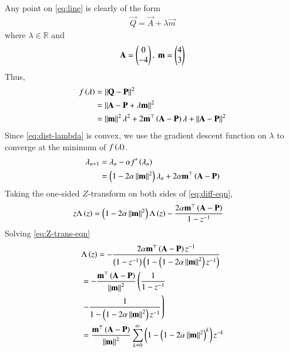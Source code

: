 \documentclass[journal,12pt,twocolumn]{IEEEtran}
\begin{document}
\begin{enumerate}
    \solution Any point on \eqref{eq:line} is clearly of the form
    \begin{align}
        \vec{Q} = \vec{A} + \lambda\vec{m}
        \label{eq:Q-def}
    \end{align}
    where $\lambda \in \mathbb{R}$ and
    \begin{align}
        \mathbf{A} = \begin{pmatrix}0\\-4\end{pmatrix},\ \mathbf{m} = \begin{pmatrix}4\\3\end{pmatrix}
        \label{eq:vals}
    \end{align}
    Thus,
    \begin{align}
        f\left(\lambda\right) &= \left\lVert\mathbf{Q}-\mathbf{P}\right\rVert^2 \\
                        &= \left\lVert\mathbf{A}-\mathbf{P}+\lambda\mathbf{m}\right\rVert^2 \\
                        &= \left\lVert\mathbf{m}\right\rVert^2\lambda^2 + 2\mathbf{m}^\top\left(\mathbf{A}-\mathbf{P}\right)\lambda + \left\lVert\mathbf{A}-\mathbf{P}\right\rVert^2
                        \label{eq:dist-lambda}
    \end{align}
    Since \eqref{eq:dist-lambda} is convex, we use the gradient descent function 
    on $\lambda$ to converge at the minimum of $f\left(\lambda\right)$.
    \begin{align}
        \lambda_{n+1} &= \lambda_n - \alpha f'\left(\lambda_n\right) \\
                      &= \left(1-2\alpha\left\lVert\mathbf{m}\right\rVert^2\right)\lambda_n + 2\alpha\mathbf{m}^\top\left(\mathbf{A}-\mathbf{P}\right)
                      \label{eq:diff-eqn}
    \end{align}
    Taking the one-sided $Z$-transform on both sides of \eqref{eq:diff-eqn},
    \begin{align}
        z\Lambda\left(z\right) &= \left(1-2\alpha\left\lVert\mathbf{m}\right\rVert^2\right)\Lambda\left(z\right) - \frac{2\alpha\mathbf{m}^\top\left(\mathbf{A}-\mathbf{P}\right)}{1-z^{-1}}
        \label{eq:Z-trans-eqn}
    \end{align}
    Solving \eqref{eq:Z-trans-eqn}
    \begin{align}
        &\Lambda\brak{z} = -\frac{2\alpha\vec{m}^\top\brak{\vec{A}-\vec{P}}z^{-1}}{\brak{1- z^{-1}}\brak{1 - \brak{1-2\alpha\norm{\vec{m}}^2}z^{-1}}} \label{eq:roc} \\
        &= -\frac{\vec{m}^\top\brak{\vec{A}-\vec{P}}}{\norm{\vec{m}}^2}\lbrak{\frac{1}{1-z^{-1}}} \\
        &\rbrak{- \frac{1}{1-\brak{1-2\alpha\norm{\vec{m}}^2}z^{-1}}} \\
        &= \frac{\vec{m}^\top\brak{\vec{A}-\vec{P}}}{\norm{\vec{m}}^2}\sum_{k=0}^{\infty}\brak{1-\brak{1-2\alpha\norm{\vec{m}}^2}^k}z^{-k}

\end{align}
\end{enumerate}
\end{document}
